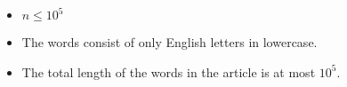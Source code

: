 \begin{itemize}
	\tightlist
	\item $n \le 10^5$
    \item The words consist of only English letters in lowercase.
	\item The total length of the words in the article is at most $10^5$.
\end{itemize}
